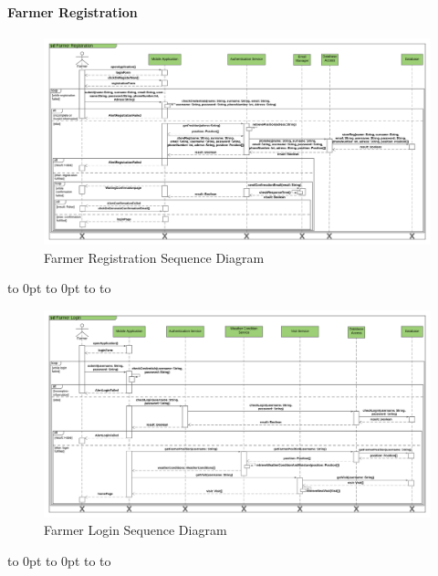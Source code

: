 \paragraph{Farmer Registration}


\def\fillandplacepagenumber{%
 \par\pagestyle{empty}%
\vbox to 0pt{\vss}\vfill
\vbox to 0pt{\baselineskip0pt
   \hbox to\linewidth{\hss}%
   \setlength{\footskip}{70pt}
   \baselineskip\footskip
   \hbox to\linewidth{%
     \hfil\thepage\hfil}\vss}}

\newpage
\begin{landscape}
\begin{figure}[h]
\vspace*{-2cm}
\noindent
\centering
\centerline{\includegraphics[scale= 0.108]{./Images/Farmer Registration Sequence Diagram.png}}
    \caption{Farmer Registration Sequence Diagram}
    \vspace*{-12cm}
\end{figure}
\fillandplacepagenumber
\end{landscape}

\newpage
\begin{landscape}
\begin{figure}[h]
\vspace*{-2cm}
\noindent
\centering
\centerline{\includegraphics[scale= 0.108]{./Images/Farmer Login Sequence Diagram.png}}
    \caption{Farmer Login Sequence Diagram}
    \vspace*{-12cm}
\end{figure}
\fillandplacepagenumber
\end{landscape}

